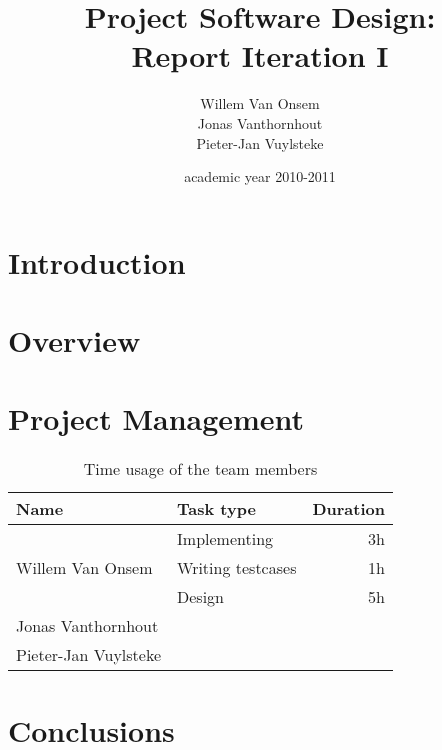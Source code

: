 \documentclass[a4paper,titlepage]{article}
\title{Project Software Design:\\Report Iteration I}
\author{Willem Van Onsem\\Jonas Vanthornhout\\Pieter-Jan Vuylsteke}
\date{academic year 2010-2011}
\begin{document}
\begin{titlepage}
\maketitle
\end{titlepage}
\tableofcontents
\newpage
\section*{Introduction}
\newpage
\section{Overview}
\newpage
\section{Project Management}
\begin{table}[H]
\centering
\begin{tabular}{llr}
\hline
Name&Task type&Duration\\
\hline
\hline
\multirow{3}{*}{Willem Van Onsem}&Implementing&3h\\
&Writing testcases&1h\\
&Design&5h\\
\hline
Jonas Vanthornhout&&\\
\hline
Pieter-Jan Vuylsteke&&\\
\hline
\end{tabular}
\caption{Time usage of the team members}
\label{tbl:timeUsage}
\end{table}
\newpage
\section{Conclusions}
\newpage
\nocite{*}


\end{document}

